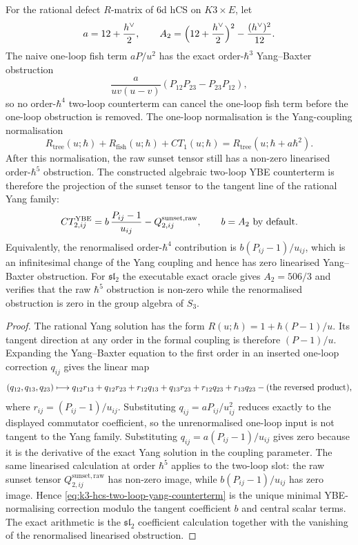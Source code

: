 \begin{proposition}
\label{prop:k3-hcs-two-loop-yang-normalisation}
For the rational defect $R$-matrix of $6$d hCS on $K3\times E$, let
\[
 a=12+\frac{h^\vee}{2},\qquad
 A_2=\Bigl(12+\frac{h^\vee}{2}\Bigr)^2-\frac{(h^\vee)^2}{12}.
\]
The naive one-loop fish term $aP/u^2$ has the exact order-$\hbar^3$
Yang--Baxter obstruction
\[
 \frac{a}{uv(u-v)}(P_{12}P_{23}-P_{23}P_{12}),
\]
so no order-$\hbar^4$ two-loop counterterm can cancel the one-loop fish term
before the one-loop obstruction is removed. The one-loop normalisation is the
Yang-coupling normalisation
\[
 R_{\mathrm{tree}}(u;\hbar)+R_{\mathrm{fish}}(u;\hbar)+CT_1(u;\hbar)
 =
 R_{\mathrm{tree}}(u;\hbar+a\hbar^2).
\]
After this normalisation, the raw sunset tensor still has a non-zero
linearised order-$\hbar^5$ obstruction. The constructed algebraic
two-loop YBE counterterm is therefore the projection of the sunset
tensor to the tangent line of the rational Yang family:
\begin{equation}
\label{eq:k3-hcs-two-loop-yang-counterterm}
 CT_{2,ij}^{\mathrm{YBE}}
 =
 b\,\frac{P_{ij}-1}{u_{ij}}
 -
 Q^{\mathrm{sunset,raw}}_{2,ij},
 \qquad b=A_2\ \textup{by default}.
\end{equation}
Equivalently, the renormalised order-$\hbar^4$ contribution is
$b(P_{ij}-1)/u_{ij}$, which is an infinitesimal change of the Yang
coupling and hence has zero linearised Yang--Baxter obstruction. For
$\mathfrak{sl}_2$ the executable exact oracle gives $A_2=506/3$ and
verifies that the raw $\hbar^5$ obstruction is non-zero while the
renormalised obstruction is zero in the group algebra of $S_3$.
\end{proposition}

\begin{proof}
The rational Yang solution has the form
$R(u;\hbar)=1+\hbar(P-1)/u$. Its tangent direction at any order in the
formal coupling is therefore $(P-1)/u$. Expanding the Yang--Baxter
equation to the first order in an inserted one-loop correction $q_{ij}$
gives the linear map
\[
 (q_{12},q_{13},q_{23})
 \longmapsto
 q_{12}r_{13}+q_{12}r_{23}+r_{12}q_{13}+q_{13}r_{23}
 +r_{12}q_{23}+r_{13}q_{23}
 -(\textup{the reversed product}),
\]
where $r_{ij}=(P_{ij}-1)/u_{ij}$. Substituting
$q_{ij}=aP_{ij}/u_{ij}^2$ reduces exactly to the displayed commutator
coefficient, so the unrenormalised one-loop input is not tangent to the Yang
family. Substituting $q_{ij}=a(P_{ij}-1)/u_{ij}$ gives zero because it
is the derivative of the exact Yang solution in the coupling parameter.
The same linearised calculation at order $\hbar^5$ applies to the
two-loop slot: the raw sunset tensor
$Q^{\mathrm{sunset,raw}}_{2,ij}$ has non-zero image, while
$b(P_{ij}-1)/u_{ij}$ has zero image. Hence
\eqref{eq:k3-hcs-two-loop-yang-counterterm} is the unique minimal
YBE-normalising correction modulo the tangent coefficient $b$ and
central scalar terms. The exact arithmetic is the
\(\mathfrak{sl}_2\) coefficient calculation together with the vanishing
of the renormalised linearised obstruction.
\end{proof}

